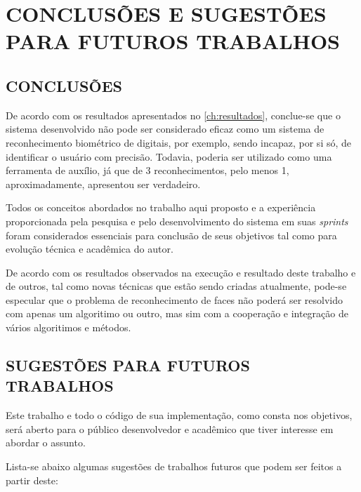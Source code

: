 
\chapter{CONCLUSÕES E SUGESTÕES PARA FUTUROS TRABALHOS}\label{ch:conclusao}
\section{CONCLUSÕES} 

De acordo com os resultados apresentados no \autoref{ch:resultados}, conclue-se que o sistema desenvolvido não pode ser considerado eficaz como um sistema de reconhecimento biométrico de digitais, por exemplo, sendo incapaz, por si só, de identificar o usuário com precisão. Todavia, poderia ser utilizado como uma ferramenta de auxílio, já que de 3 reconhecimentos, pelo menos 1, aproximadamente, apresentou ser verdadeiro.

Todos os conceitos abordados no trabalho aqui proposto e a experiência proporcionada pela pesquisa e pelo desenvolvimento do sistema em suas \textit{sprints} foram considerados essenciais para conclusão de seus objetivos tal como para evolução técnica e acadêmica do autor. 

De acordo com os resultados observados na execução e resultado deste trabalho e de outros, tal como novas técnicas que estão sendo criadas atualmente, pode-se especular que o problema de reconhecimento de faces não poderá ser resolvido com apenas um algoritimo ou outro, mas sim com a cooperação e integração de vários algoritimos e métodos.


\section{SUGESTÕES PARA FUTUROS TRABALHOS}


Este trabalho e todo o código de sua implementação, como consta nos objetivos, será aberto para o público desenvolvedor e acadêmico que tiver interesse em abordar o assunto. 

Lista-se abaixo algumas sugestões de trabalhos futuros que podem ser feitos a partir deste:


